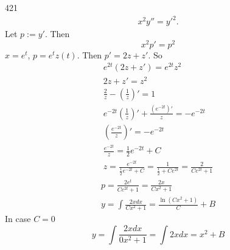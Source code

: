 \documentclass[12pt,a4paper]{article}
\begin{document}
    \begin{problem}{421}
        \begin{gather*}
            x^2 y'' = y'^2.
        \end{gather*}
        Let $p := y'$. Then
        \[x^2 p' = p^2\]
        $x = e^t$, $p = e^t z(t)$. Then $p' = 2 z + z'$. So
        \begin{gather*}
            e^{2t} (2 z + z') = e^{2t} z^2\\
            2z + z' = z^2\\
            \frac{2}{z} - \left(\frac{1}{z}\right)' = 1\\
            e^{-2t}\left(\frac{1}{z}\right)' + \frac{(e^{-2t})'}{z} = -e^{-2t}\\
            \left(\frac{e^{-2t}}{z}\right)' = -e^{-2t}\\
            \frac{e^{-2t}}{z} = \frac{1}{2}e^{-2t} + C\\
            z = \frac{e^{-2t}}{\frac{1}{2}e^{-2t} + C} = \frac{1}{\frac{1}{2} + C e^{2t}} = \frac{2}{C e^{2t} + 1}
        \end{gather*}
        \begin{gather*}
            p = \frac{2 e^t}{C e^{2t} + 1} = \frac{2x}{Cx^2 + 1}\\
            y = \int \frac{2xdx}{Cx^2 + 1} = \frac{\ln(Cx^2 + 1)}{C} + B
        \end{gather*}
        In case $C = 0$
        \[y = \int \frac{2xdx}{0x^2 + 1} = \int 2xdx = x^2 + B\]
    \end{problem}
\end{document}
